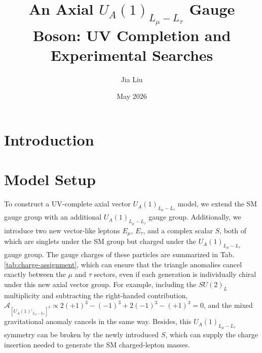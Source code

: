 \documentclass[onecolumn, aps, nofootinbib, prd, preprint, floats, floatfix, amsmath, amssymb, superscriptaddress, preprintnumbers]{revtex4-1}
\begin{document}
\title{An Axial $U_A(1)_{L_\mu-L_\tau}$ Gauge Boson: UV Completion and Experimental Searches}
\author{Jia Liu}
\date{May 2026}


\maketitle
\tableofcontents

\section{Introduction}

\section{Model Setup}
\label{sec:model-setup}
To construct a UV-complete axial vector ${ U_A(1)}_{L_\mu-L_\tau}$ model, we extend the SM gauge group with an additional ${ U_A(1)}_{L_\mu-L_\tau}$ gauge group. Additionally, we introduce two new vector-like leptons $E_\mu$, $E_\tau$, and a complex scalar $S$, both of which are singlets under the SM group but charged under the ${U_A(1)}_{L_\mu-L_\tau}$ gauge group. The gauge charges of these particles are summarized in Tab. \ref{tab:charge-assignment}, which can ensure that the triangle anomalies cancel exactly between the $\mu$ and $\tau$ sectors, even if each generation is individually chiral under this new axial vector group. For example, including the $SU(2)_L$ multiplicity and subtracting the right-handed contribution, $\mathcal{A}_{[U_A(1)'_{L_\mu-L_\tau}]^3} \propto 2(+1)^3-(-1)^3+2(-1)^3-(+1)^3=0$, and the mixed gravitational anomaly cancels in the same way. Besides, this ${U_A(1)}_{L_\mu-L_\tau}$ symmetry can be broken by the newly introduced $S$, which can supply the charge insertion needed to generate the SM charged-lepton masses.
\end{document}
